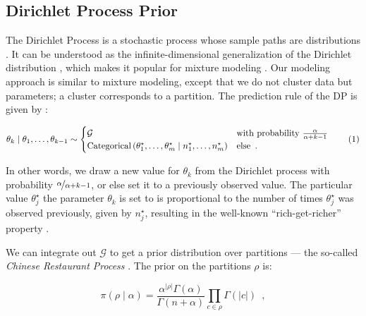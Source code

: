 \documentclass[11pt,a4paper]{article}
\theoremstyle{definition} %
\theoremstyle{case}
\newcommand{\numberthis}{\addtocounter{equation}{1}\tag{\theequation}}
\begin{document}
\subsection{Dirichlet Process Prior}
The Dirichlet Process is a stochastic process whose sample paths are distributions \parencite{ferguson1973bayesian}. It can be understood as the infinite-dimensional generalization of the Dirichlet distribution \parencite[e.g.,][]{teh2010dirichlet}, which makes it popular for mixture modeling \parencite{rasmussen1999infinite}. Our modeling approach is similar to mixture modeling, except that we do not cluster data but parameters; a cluster corresponds to a partition. The prediction rule of the DP is given by \parencite[e.g.,][]{ishwaran2001gibbs, blackwell1973ferguson}:

\begin{equation} \label{eq:prediction-rule}
    \theta_k \mid \theta_1, \ldots, \theta_{k - 1} \sim \begin{cases}
    \mathcal{G} & \text{with probability } \frac{\alpha}{\alpha + k - 1} \\
    \text{Categorical}\left(\theta_1^{\star}, \ldots, \theta_m^{\star} \mid n^{\star}_1, \ldots, n^{\star}_m\right) & \text{else} \enspace .
    \end{cases} \numberthis
\end{equation}

In other words, we draw a new value for $\theta_k$ from the Dirichlet process with probability $\nicefrac{\alpha}{\alpha + k - 1}$, or else set it to a previously observed value. The particular value $\theta^{\star}_j$ the parameter $\theta_k$ is set to is proportional to the number of times $\theta^{\star}_j$ was observed previously, given by $n^{\star}_j$, resulting in the well-known ``rich-get-richer'' property \parencite[e.g.,][]{teh2010dirichlet}.

We can integrate out $\mathcal{G}$ to get a prior distribution over partitions --- the so-called \textit{Chinese Restaurant Process} \parencite[e.g.,][]{teh2010dirichlet}. The prior on the partitions $\rho$ is:

\begin{equation}
    \pi(\rho \mid \alpha) = \frac{\alpha^{|\rho|}\Gamma(\alpha)}{\Gamma(n + \alpha)} \prod_{c \in \rho} \Gamma(|c|) \enspace ,
\end{equation}
\end{document}
